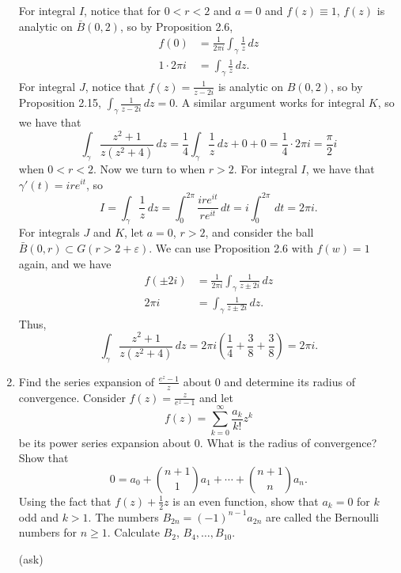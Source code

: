 \documentclass[11pt,oneside,english]{amsart}
\theoremstyle{definition}
\newcommand{\ve}{\varepsilon}
\begin{document}
\begin{enumerate}[leftmargin=*]
For integral $I$, notice that for $0<r<2$ and $a=0$ and $f(z)\equiv 1$, $f(z)$ is analytic on $\bar B(0,2)$, so by Proposition 2.6,
\begin{align*}
f(0)&=\frac{1}{2\pi i}\int_\gamma\frac{1}{z}\,dz\\[2mm]
1\cdot 2\pi i&=\int_\gamma \frac{1}{z}\,dz.
\end{align*}
For integral $J$, notice that $f(z)=\frac{1}{z-2i}$ is analytic on $B(0,2)$, so by Proposition 2.15, $\int_\gamma \frac{1}{z-2i}\,dz=0$. A similar argument works for integral $K$, so we have that
\[
\int_\gamma \frac{z^2+1}{z(z^2+4)}\,dz=\frac{1}{4}\int_\gamma\frac{1}{z}\,dz+0+0=\frac{1}{4}\cdot2\pi i=\frac{\pi}{2}i
\]
when $0<r<2$. Now we turn to when $r>2$. For integral $I$, we have that $\gamma'(t)=ire^{it}$, so 
\[
I=\int_\gamma \frac{1}{z}\,dz=\int_0^{2\pi}\frac{ire^{it}}{re^{it}}\,dt=i\int_0^{2\pi}\,dt=2\pi i.
\]
For integrals $J$ and $K$, let $a=0$, $r>2$, and consider the ball $\bar B(0,r)\subset G(r>2+\ve)$. We can use Proposition 2.6 with $f(w)=1$ again, and we have
\begin{align*}
f(\pm2i)&=\frac{1}{2\pi i}\int_\gamma \frac{1}{z\pm2i}\,dz\\[2mm]
2\pi i&=\int_\gamma \frac{1}{z\pm2i}\,dz.
\end{align*}
Thus,
\[
\int_\gamma \frac{z^2+1}{z(z^2+4)}\,dz=2\pi i\left(\frac{1}{4}+\frac{3}{8}+\frac{3}{8}\right)=2\pi i.
\]

\pagebreak

\setcounter{enumi}{12}

\item Find the series expansion of $\displaystyle \frac{e^z-1}{z}$ about 0 and determine its radius of convergence. Consider $\displaystyle f(z)=\frac{z}{e^z-1}$ and let
\[
f(z)=\sum_{k=0}^\infty \frac{a_k}{k!}z^k
\]
be its power series expansion about 0. What is the radius of convergence? Show that
\[
0=a_0+{n+1\choose 1}a_1+\cdots+{n+1\choose n}a_n.
\]
Using the fact that $f(z)+\frac{1}{2}z$ is an even function, show that $a_k=0$ for $k$ odd and $k>1$. The numbers $B_{2n}=(-1)^{n-1}a_{2n}$ are called the Bernoulli numbers for $n\geq 1$. Calculate $B_2$, $B_4,\ldots,B_10$.


(ask)


\end{enumerate}
\end{document}
